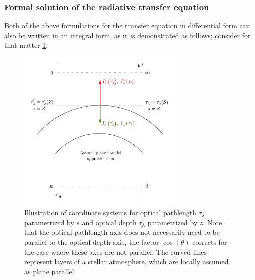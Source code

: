 \documentclass[a4paper,12pt]{report}
\begin{document}
\subsubsection{Formal solution of the radiative transfer equation}
Both of the above formulations for the transfer equation in differential form can also be written in an integral form, as it is demonstrated as follows; consider for that matter \cref{fig:outward-inward-radiation}.
\begin{figure}[h!]
\centering
\includegraphics[width=8cm]{figures/outward-inward-radiation.pdf}
\caption{Illustration of coordinate systems for optical pathlength $\tau_\lambda$ parametrized by $s$ and optical depth $\tau_\lambda^\prime$ parametrized by $z$. Note, that the optical pathlength axis does not necessarily need to be parallel to the optical depth axis, the factor $\cos(\theta)$ corrects for the case where these axes are not parallel. The curved lines represent layers of a stellar atmosphere, which are locally assumed as plane parallel.}
\label{fig:outward-inward-radiation}
\end{figure}
\end{document}
